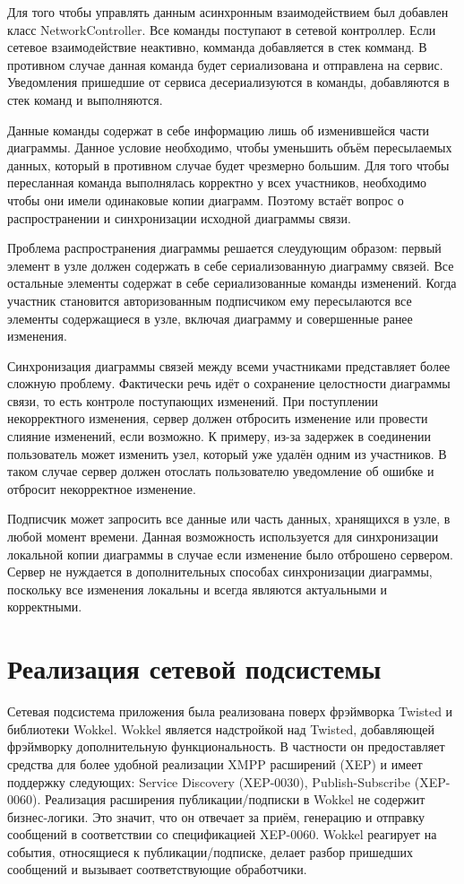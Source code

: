 Для того чтобы управлять данным асинхронным взаимодействием был добавлен класс
NetworkController. Все команды поступают в сетевой контроллер. Если сетевое
взаимодействие неактивно, комманда добавляется в стек комманд. В противном
случае данная команда будет сериализована и отправлена на сервис. Уведомления
пришедшие от сервиса десериализуются в команды, добавляются в стек команд и
выполняются.

Данные команды содержат в себе информацию лишь об изменившейся части диаграммы.
Данное условие необходимо, чтобы уменьшить объём пересылаемых данных, который в
противном случае будет чрезмерно большим. Для того чтобы пересланная команда
выполнялась корректно у всех участников, необходимо чтобы они имели одинаковые
копии диаграмм. Поэтому встаёт вопрос о распространении и синхронизации
исходной диаграммы связи.

Проблема распространения диаграммы решается слеудующим образом: первый элемент в
узле должен содержать в себе сериализованную диаграмму связей. Все остальные
элементы содержат в себе сериализованные команды изменений. Когда участник
становится авторизованным подписчиком ему пересылаются все элементы содержащиеся
в узле, включая диаграмму и совершенные ранее изменения.

Синхронизация диаграммы связей между всеми участниками представляет более
сложную проблему. Фактически речь идёт о сохранение целостности диаграммы связи,
то есть контроле поступающих изменений. При поступлении некорректного изменения,
сервер должен отбросить изменение или провести слияние изменений, если возможно.
К примеру, из-за задержек в соединении пользователь может изменить узел, который
уже удалён одним из участников. В таком случае сервер должен отослать
пользователю уведомление об ошибке и отбросит некорректное изменение.

Подписчик может запросить все данные или часть данных, хранящихся в узле, в
любой момент времени. Данная возможность используется для синхронизации
локальной копии диаграммы в случае если изменение было отброшено сервером.
Сервер не нуждается в дополнительных способах синхронизации диаграммы, поскольку
все изменения локальны и всегда являются актуальными и корректными.

\section{Реализация сетевой подсистемы}
Сетевая подсистема приложения была реализована поверх фрэймворка Twisted и
библиотеки Wokkel. Wokkel является надстройкой над Twisted, добавляющей
фрэймворку дополнительную функциональность. В частности он предоставляет
средства для более удобной реализации XMPP расширений (XEP) и имеет поддержку
следующих: Service Discovery (XEP-0030), Publish-Subscribe (XEP-0060).
Реализация расширения публикации/подписки в Wokkel не содержит бизнес-логики.
Это значит, что он отвечает за приём, генерацию и отправку сообщений в
соответствии со спецификацией XEP-0060. Wokkel реагирует на события, относящиеся
к публикации/подписке, делает разбор пришедших сообщений и вызывает
соответствующие обработчики.


